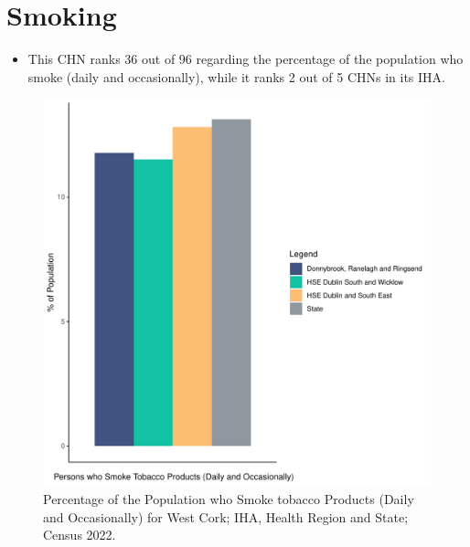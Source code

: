 \documentclass{article}
\begin{document}
\pagebreak

\section{Smoking}\label{sect:Smoking}
\begin{itemize}
\item This CHN ranks  36 out of 96 regarding the percentage of the population who smoke (daily and occasionally), while it ranks   2 out of 5 CHNs in its IHA.
\end{itemize}
\begin{figure}[H]
	\centering
	\includegraphics[width = 120mm]{../figures/SmokingED.pdf}
	\caption{Percentage of the Population who Smoke tobacco Products (Daily and Occasionally) for West Cork; IHA, Health Region and State; Census 2022.}
	\label{fig:2ae19629-1a6a-13a3-e055-000000000001}
	\end{figure}
	
\end{document}
